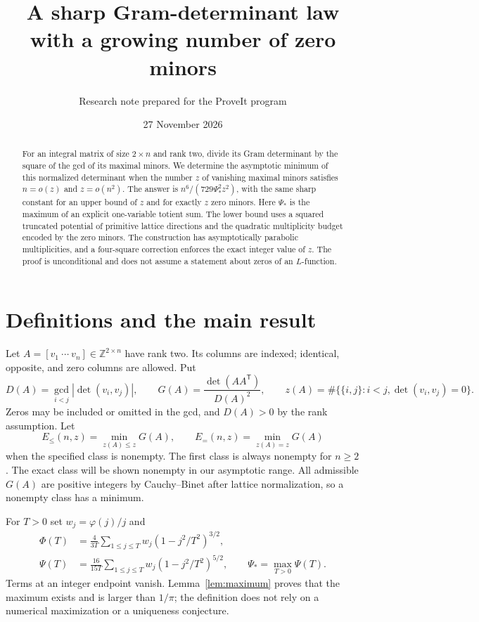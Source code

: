 \documentclass[11pt]{article}
\title{A sharp Gram-determinant law with a growing number of zero minors}
\author{Research note prepared for the ProveIt program}
\date{27 November 2026}
\theoremstyle{remark}\newtheorem{remark}[theorem]{Remark}
\newcommand{\Z}{\mathbb Z}\newcommand{\R}{\mathbb R}\newcommand{\N}{\mathbb N}
\begin{document}
\maketitle
\begin{abstract}
For an integral matrix of size $2\times n$ and rank two, divide its Gram determinant by the square of the gcd of its maximal minors. We determine the asymptotic minimum of this normalized determinant when the number $z$ of vanishing maximal minors satisfies $n=o(z)$ and $z=o(n^2)$. The answer is $n^6/(729\Psi_*^2z^2)$, with the same sharp constant for an upper bound of $z$ and for exactly $z$ zero minors. Here $\Psi_*$ is the maximum of an explicit one-variable totient sum. The lower bound uses a squared truncated potential of primitive lattice directions and the quadratic multiplicity budget encoded by the zero minors. The construction has asymptotically parabolic multiplicities, and a four-square correction enforces the exact integer value of $z$. The proof is unconditional and does not assume a statement about zeros of an $L$-function.
\end{abstract}

\section{Definitions and the main result}
Let $A=[v_1\ \cdots\ v_n]\in\Z^{2\times n}$ have rank two. Its columns are indexed; identical, opposite, and zero columns are allowed. Put
\[
 D(A)=\gcd_{i<j}|\det(v_i,v_j)|,\qquad
 G(A)=\frac{\det(AA^{\mathsf T})}{D(A)^2},\qquad
 z(A)=\#\{\{i,j\}:i<j,\det(v_i,v_j)=0\}.
\]
Zeros may be included or omitted in the gcd, and $D(A)>0$ by the rank assumption. Let
\[
 E_{\le}(n,z)=\min_{z(A)\le z}G(A),\qquad
 E_{=}(n,z)=\min_{z(A)=z}G(A)
\]
when the specified class is nonempty. The first class is always nonempty for $n\ge2$. The exact class will be shown nonempty in our asymptotic range. All admissible $G(A)$ are positive integers by Cauchy--Binet after lattice normalization, so a nonempty class has a minimum.

For $T>0$ set $w_j=\varphi(j)/j$ and
\begin{align}
 \Phi(T)&=\frac4{3T}\sum_{1\le j\le T}w_j(1-j^2/T^2)^{3/2},\label{eq:phi}\\
 \Psi(T)&=\frac{16}{15T}\sum_{1\le j\le T}w_j(1-j^2/T^2)^{5/2},\qquad
 \Psi_* =\max_{T>0}\Psi(T).\label{eq:psi}
\end{align}
Terms at an integer endpoint vanish. Lemma~\ref{lem:maximum} proves that the maximum exists and is larger than $1/\pi$; the definition does not rely on a numerical maximization or a uniqueness conjecture.
\end{document}
